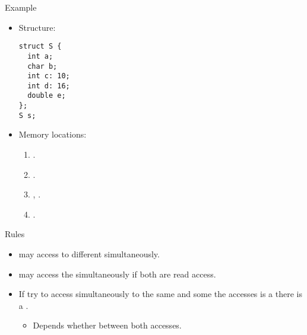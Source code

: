 \begin{frame}[t,fragile]{Example}
\begin{itemize}
  \item Structure:
\begin{lstlisting}
struct S {
  int a;
  char b;
  int c: 10;
  int d: 16;
  double e;
};
S s;
\end{lstlisting}
  \item Memory locations:
    \begin{enumerate}
      \item {}.
      \item {}.
      \item {}, .
      \item {}.
    \end{enumerate}
\end{itemize}
\end{frame}

\begin{frame}[t]{Rules}
\begin{itemize}
  \item {} may access to different 
        simultaneously.

  \item {} may access the 
        simultaneously if both are read access. 

  \item If  try to access simultaneously to the same
         and some the accesses is a 
        there is a .
    \begin{itemize}
      \item Depends whether  between both accesses.
    \end{itemize}
\end{itemize}
\end{frame}

